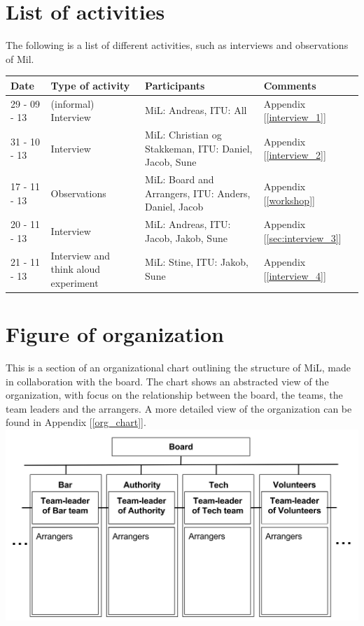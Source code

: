 \section{List of activities}
The following is a list of different activities, such as interviews and observations of Mil.
\begin{center}
\begin{table}[H]
    \begin{tabular}{|p{3cm}|p{3cm}|p{3cm}|p{6cm}|}
    \hline
    \textbf{Date} & \textbf{Type of activity} & \textbf{Participants} & \textbf{Comments} \\ \hline
    29 - 09 - 13 & (informal) Interview & MiL: Andreas, ITU: All & Appendix  [\ref{interview_1}]\\ \hline
    31 - 10 - 13 & Interview & MiL: Christian og Stakkeman, ITU: Daniel, Jacob, Sune &  Appendix [\ref{interview_2}]  \\ \hline
    17 - 11 - 13 & Observations & MiL: Board and Arrangers, ITU: Anders, Daniel, Jacob & Appendix [\ref{workshop}] \\ \hline
    20 - 11 - 13 & Interview & MiL: Andreas, ITU: Jacob, Jakob, Sune & Appendix [\ref{sec:interview_3}] \\ \hline
    21 - 11 - 13 & Interview and think aloud experiment & MiL: Stine, ITU: Jakob, Sune & Appendix [\ref{interview_4}] \\ \hline
    \end{tabular}
\end{table}
\end{center}

\section{Figure of organization}
\label{sec:organisation}
This is a section of an organizational chart outlining the structure of MiL, made in collaboration with the board. The chart shows an abstracted view of the organization, with focus on the relationship between the board, the teams, the team leaders and the arrangers. A more detailed view of the organization can be found in Appendix [\ref{org_chart}].\\
\includegraphics[scale=0.7]{Pictures/MIL_Organisational_chart_Abstract.png}
